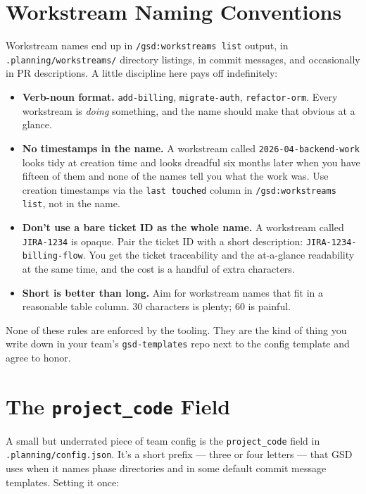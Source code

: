 \documentclass[11pt,letterpaper,openany]{book}
\begin{document}
\section{Workstream Naming Conventions}

Workstream names end up in \texttt{/gsd:workstreams list} output,
in \texttt{.planning/workstreams/} directory listings, in commit
messages, and occasionally in PR descriptions. A little discipline
here pays off indefinitely:

\begin{itemize}
\item \textbf{Verb-noun format.} \texttt{add-billing},
  \texttt{migrate-auth}, \texttt{refactor-orm}. Every workstream
  is \emph{doing} something, and the name should make that obvious
  at a glance.
\item \textbf{No timestamps in the name.} A workstream called
  \texttt{2026-04-backend-work} looks tidy at creation time and
  looks dreadful six months later when you have fifteen of them
  and none of the names tell you what the work was. Use creation
  timestamps via the \texttt{last touched} column in
  \texttt{/gsd:workstreams list}, not in the name.
\item \textbf{Don't use a bare ticket ID as the whole name.} A
  workstream called \texttt{JIRA-1234} is opaque. Pair the ticket
  ID with a short description: \texttt{JIRA-1234-billing-flow}.
  You get the ticket traceability and the at-a-glance readability
  at the same time, and the cost is a handful of extra characters.
\item \textbf{Short is better than long.} Aim for workstream names
  that fit in a reasonable table column. 30 characters is plenty;
  60 is painful.
\end{itemize}

None of these rules are enforced by the tooling. They are the kind
of thing you write down in your team's \texttt{gsd-templates} repo
next to the config template and agree to honor.

\section{The \texttt{project\_code} Field}

A small but underrated piece of team config is the
\texttt{project\_code} field in \texttt{.planning/config.json}.
It's a short prefix --- three or four letters --- that GSD uses
when it names phase directories and in some default commit message
templates. Setting it once:
\end{document}
